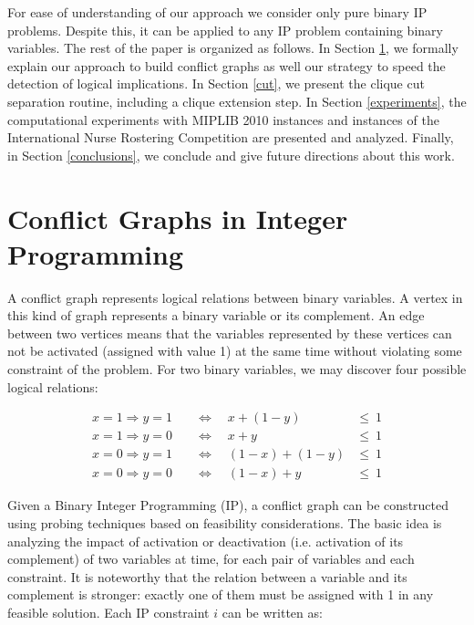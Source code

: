 \documentclass{endm}
\begin{document}
For ease of understanding of our approach we consider only pure binary IP problems. Despite this, it can be applied to any IP problem containing binary variables. The rest of the paper is organized as follows. In Section \ref{graph}, we formally explain our approach to build conflict graphs as well our strategy to speed the detection of logical implications. In Section \ref{cut}, we present the clique cut separation routine, including a clique extension step. In Section \ref{experiments}, the computational experiments with MIPLIB 2010 instances \cite{miplib} and instances of the International Nurse Rostering Competition \cite{haspeslagh} are presented and analyzed. Finally, in Section \ref{conclusions}, we conclude and give future directions about this work.

\section{Conflict Graphs in Integer Programming}\label{graph}

A conflict graph represents logical relations between binary variables. A vertex in this kind of graph represents a binary variable or its complement. An edge between two vertices means that the variables represented by these vertices can not be activated (assigned with value 1) at the same time without violating some constraint of the problem. For two binary variables, we may discover four possible logical relations:

\begin{align}
x = 1 \Rightarrow y = 1 & \quad \Longleftrightarrow \quad x + (1 - y) & \leq \ 1\\
x = 1 \Rightarrow y = 0 & \quad \Longleftrightarrow \quad x + y & \leq \ 1 \\
x = 0 \Rightarrow y = 1 & \quad \Longleftrightarrow \quad (1 - x) + (1 - y) & \leq \ 1 \\
x = 0 \Rightarrow y = 0 & \quad \Longleftrightarrow \quad (1 - x) + y & \leq \ 1
\end{align}

Given a Binary Integer Programming (IP), a conflict graph can be constructed using probing techniques based on feasibility considerations. The basic idea is analyzing the impact of activation or deactivation (i.e. activation of its complement) of two variables at time, for each pair of variables and each constraint. It is noteworthy that the relation between a variable and its complement is stronger: exactly one of them must be assigned with 1 in any feasible solution. Each IP constraint $i$ can be written as:
\end{document}
